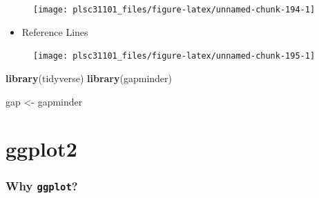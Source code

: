\documentclass[]{book}
\newenvironment{Shaded}{\begin{snugshade}}{\end{snugshade}}
\newcommand{\KeywordTok}[1]{\textcolor[rgb]{0.13,0.29,0.53}{\textbf{#1}}}
\newcommand{\DataTypeTok}[1]{\textcolor[rgb]{0.13,0.29,0.53}{#1}}
\newcommand{\DecValTok}[1]{\textcolor[rgb]{0.00,0.00,0.81}{#1}}
\newcommand{\StringTok}[1]{\textcolor[rgb]{0.31,0.60,0.02}{#1}}
\newcommand{\CommentTok}[1]{\textcolor[rgb]{0.56,0.35,0.01}{\textit{#1}}}
\newcommand{\OperatorTok}[1]{\textcolor[rgb]{0.81,0.36,0.00}{\textbf{#1}}}
\newcommand{\NormalTok}[1]{#1}
\providecommand{\tightlist}{%
  \setlength{\itemsep}{0pt}\setlength{\parskip}{0pt}}
\begin{document}
\begin{figure}

{\centering \texttt{[image: plsc31101\_files/figure-latex/unnamed-chunk-194-1]} 

}

\caption{ }\label{fig:unnamed-chunk-194}
\end{figure}

\begin{itemize}
\tightlist
\item
  Reference Lines
\end{itemize}

\begin{Shaded}
\end{Shaded}

\begin{figure}

{\centering \texttt{[image: plsc31101\_files/figure-latex/unnamed-chunk-195-1]} 

}

\caption{ }\label{fig:unnamed-chunk-195}
\end{figure}

\begin{Shaded}
\begin{Highlighting}[]
\KeywordTok{library}\NormalTok{(tidyverse)}
\KeywordTok{library}\NormalTok{(gapminder)}

\NormalTok{gap <-}\StringTok{ }\NormalTok{gapminder}
\end{Highlighting}
\end{Shaded}

\section{ggplot2}\label{ggplot2}

\subsubsection*{\texorpdfstring{Why
\texttt{ggplot}?}{Why ggplot?}}\label{why-ggplot}
\end{document}
